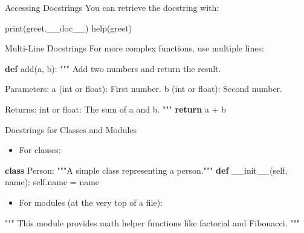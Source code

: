 \documentclass[
  letterpaper,
  DIV=11,
  numbers=noendperiod]{scrreprt}
\newenvironment{Shaded}{\begin{snugshade}}{\end{snugshade}}
\newcommand{\BuiltInTok}[1]{\textcolor[rgb]{0.00,0.23,0.31}{#1}}
\newcommand{\CommentTok}[1]{\textcolor[rgb]{0.37,0.37,0.37}{#1}}
\newcommand{\ControlFlowTok}[1]{\textcolor[rgb]{0.00,0.23,0.31}{\textbf{#1}}}
\newcommand{\FunctionTok}[1]{\textcolor[rgb]{0.28,0.35,0.67}{#1}}
\newcommand{\KeywordTok}[1]{\textcolor[rgb]{0.00,0.23,0.31}{\textbf{#1}}}
\newcommand{\NormalTok}[1]{\textcolor[rgb]{0.00,0.23,0.31}{#1}}
\newcommand{\OperatorTok}[1]{\textcolor[rgb]{0.37,0.37,0.37}{#1}}
\newcommand{\VariableTok}[1]{\textcolor[rgb]{0.07,0.07,0.07}{#1}}
\providecommand{\tightlist}{%
  \setlength{\itemsep}{0pt}\setlength{\parskip}{0pt}}
\begin{document}
Accessing Docstrings You can retrieve the docstring with:

\begin{Shaded}
\begin{Highlighting}[]
\BuiltInTok{print}\NormalTok{(greet.\_\_doc\_\_)}
\BuiltInTok{help}\NormalTok{(greet)}
\end{Highlighting}
\end{Shaded}

Multi-Line Docstrings For more complex functions, use multiple lines:

\begin{Shaded}
\begin{Highlighting}[]
\KeywordTok{def}\NormalTok{ add(a, b):}
    \CommentTok{"""}
\CommentTok{    Add two numbers and return the result.}

\CommentTok{    Parameters:}
\CommentTok{        a (int or float): First number.}
\CommentTok{        b (int or float): Second number.}

\CommentTok{    Returns:}
\CommentTok{        int or float: The sum of a and b.}
\CommentTok{    """}
    \ControlFlowTok{return}\NormalTok{ a }\OperatorTok{+}\NormalTok{ b}
\end{Highlighting}
\end{Shaded}

Docstrings for Classes and Modules

\begin{itemize}
\tightlist
\item
  For classes:
\end{itemize}

\begin{Shaded}
\begin{Highlighting}[]
\KeywordTok{class}\NormalTok{ Person:}
    \CommentTok{"""A simple class representing a person."""}
    \KeywordTok{def} \FunctionTok{\_\_init\_\_}\NormalTok{(}\VariableTok{self}\NormalTok{, name):}
        \VariableTok{self}\NormalTok{.name }\OperatorTok{=}\NormalTok{ name}
\end{Highlighting}
\end{Shaded}

\begin{itemize}
\tightlist
\item
  For modules (at the very top of a file):
\end{itemize}

\begin{Shaded}
\begin{Highlighting}[]
\CommentTok{"""}
\CommentTok{This module provides math helper functions}
\CommentTok{like factorial and Fibonacci.}
\CommentTok{"""}
\end{Highlighting}
\end{Shaded}
\end{document}
